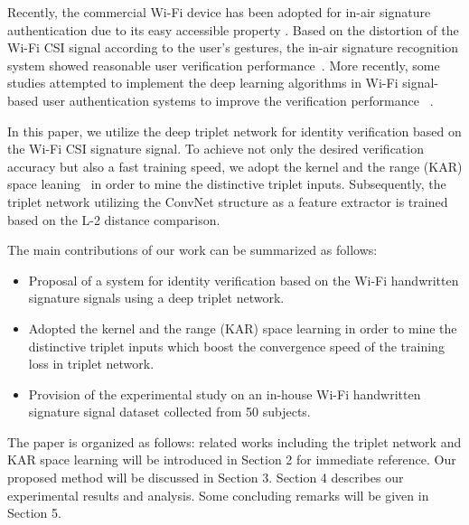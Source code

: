 \documentclass[runningheads]{llncs}
\begin{document}
Recently, the commercial Wi-Fi device has been adopted for in-air signature authentication due to its easy accessible property \cite{moon2017air}. Based on the distortion of the  Wi-Fi CSI signal according to the user's gestures, the in-air signature recognition system showed reasonable user verification performance~\cite{moon2017air}. 
More recently, some studies attempted to implement the deep learning algorithms in Wi-Fi signal-based user authentication systems to improve the verification performance ~\cite{shi2017smart,pokkunuru2018neuralwave}. 

In this paper, we utilize the deep triplet network for identity verification based on the Wi-Fi CSI signature signal. To achieve not only the desired verification accuracy but also a fast training speed, we adopt the kernel and the range (KAR) space leaning~\cite{toh100,toh2018learning,toh2018analytic,toh2018gradient} in order to mine the distinctive triplet inputs. Subsequently, the triplet network utilizing the ConvNet structure as a feature extractor is trained based on the L-2 distance comparison.

The main contributions of our work can be summarized as follows:
\begin{itemize}
\item Proposal of a system for identity verification based on the Wi-Fi handwritten signature signals using a deep triplet network.
\item Adopted the kernel and the range (KAR) space learning in order to mine the distinctive triplet inputs which boost the convergence speed of the training loss in triplet network.
\item Provision of the experimental study on an in-house Wi-Fi handwritten signature signal dataset collected from 50 subjects.
\end{itemize}

The paper is organized as follows: related works including the triplet network and KAR space learning will be introduced in Section 2 for immediate reference. Our proposed method will be discussed in Section 3. Section 4 describes our experimental results and analysis. Some concluding remarks will be given in Section 5.
\end{document}
